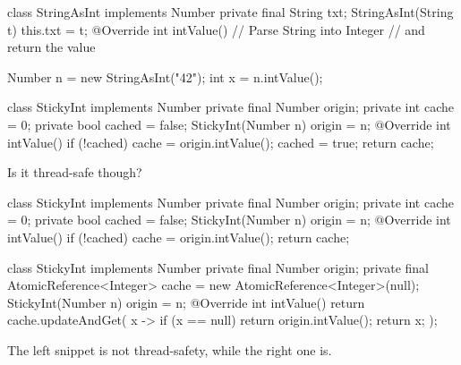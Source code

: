 \documentclass{article}
\begin{document}

\begin{pptWide}{2}
{\small\begin{ffcode}
class StringAsInt implements Number {
  private final String txt;
  StringAsInt(String t) { this.txt = t; }
  @Override int intValue() {
    // Parse String into Integer
    // and return the value
  }
}

Number n = new StringAsInt("42");
int x = n.intValue();
\end{ffcode}
}
\par\columnbreak\par
{\small\begin{ffcode}
class StickyInt implements Number {
  private final Number origin;
  private int cache = 0;
  private bool cached = false;
  StickyInt(Number n) { origin = n; }
  @Override int intValue() {
    if (!cached) {
      cache = origin.intValue();
      cached = true;
    }
    return cache;
  }
}
\end{ffcode}
}
\end{pptWide}
\par
Is it thread-safe though?
\plush{}

\begin{pptWide}{2}
{\small\begin{ffcode}
class StickyInt implements Number {
  private final Number origin;
  private int cache = 0;
  private bool cached = false;
  StickyInt(Number n) { origin = n; }
  @Override int intValue() {
    if (!cached) {
      cache = origin.intValue();
    }
    return cache;
  }
}
\end{ffcode}
}
\par\columnbreak\par
{\scriptsize\begin{ffcode}
class StickyInt implements Number {
  private final Number origin;
  private final AtomicReference<Integer> cache =
    new AtomicReference<Integer>(null);
  StickyInt(Number n) { origin = n; }
  @Override int intValue() {
    return cache.updateAndGet(
      x -> {
        if (x == null) {
          return origin.intValue();
        }
        return x;
      }
    );
  }
}
\end{ffcode}
}
\end{pptWide}
\par
The left snippet is not thread-safety, while the right one is.
\plush{}
\end{document}
